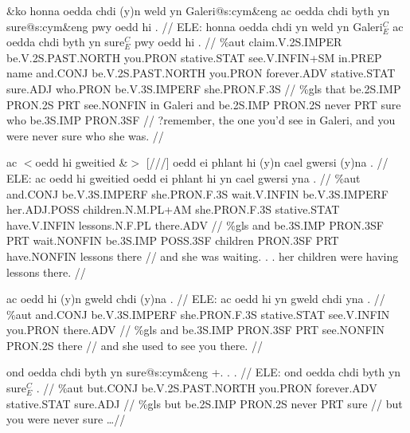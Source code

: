\documentclass[a4paper,10pt]{article}
\begin{document}
\ex
\begingl[lingstyle=gergl]
\glchat \&ko honna oedda chdi (y)n weld yn Galeri@s:cym\&eng ac oedda chdi byth yn sure@s:cym\&eng pwy oedd hi . //
\glsurface ELE:  honna oedda chdi yn weld yn Galeri$^{C}_{E}$ ac oedda chdi byth yn sure$^{C}_{E}$ pwy oedd hi .  //
\glauto \%aut  claim{\scriptsize .V.2S.IMPER} be{\scriptsize .V.2S.PAST.NORTH} you{\scriptsize .PRON} stative{\scriptsize .STAT} see{\scriptsize .V.INFIN+SM} in{\scriptsize .PREP} name and{\scriptsize .CONJ} be{\scriptsize .V.2S.PAST.NORTH} you{\scriptsize .PRON} forever{\scriptsize .ADV} stative{\scriptsize .STAT} sure{\scriptsize .ADJ} who{\scriptsize .PRON} be{\scriptsize .V.3S.IMPERF} she{\scriptsize .PRON.F.3S}   //
\glmanual \%gls  that be{\scriptsize .2S.IMP} PRON{\scriptsize .2S} PRT see{\scriptsize .NONFIN} in Galeri and be{\scriptsize .2S.IMP} PRON{\scriptsize .2S} never PRT sure who be{\scriptsize .3S.IMP} PRON{\scriptsize .3SF}   //
\gleng ?remember, the one you'd see in Galeri, and you were never sure who she was. //
\endgl
\xe

\ex
\begingl[lingstyle=gergl]
\glchat ac $<$oedd hi gweitied \&$>$ [///] oedd ei phlant hi (y)n cael gwersi (y)na . //
\glsurface ELE:  ac oedd hi gweitied oedd ei phlant hi yn cael gwersi yna .  //
\glauto \%aut  and{\scriptsize .CONJ} be{\scriptsize .V.3S.IMPERF} she{\scriptsize .PRON.F.3S} wait{\scriptsize .V.INFIN} be{\scriptsize .V.3S.IMPERF} her{\scriptsize .ADJ.POSS} children{\scriptsize .N.M.PL+AM} she{\scriptsize .PRON.F.3S} stative{\scriptsize .STAT} have{\scriptsize .V.INFIN} lessons{\scriptsize .N.F.PL} there{\scriptsize .ADV}   //
\glmanual \%gls  and be{\scriptsize .3S.IMP} PRON{\scriptsize .3SF} PRT wait{\scriptsize .NONFIN} be{\scriptsize .3S.IMP} POSS{\scriptsize .3SF} children PRON{\scriptsize .3SF} PRT have{\scriptsize .NONFIN} lessons there  //
\gleng and she was waiting. . . her children were having lessons there. //
\endgl
\xe

\ex
\begingl[lingstyle=gergl]
\glchat ac oedd hi (y)n gweld chdi (y)na . //
\glsurface ELE:  ac oedd hi yn gweld chdi yna .  //
\glauto \%aut  and{\scriptsize .CONJ} be{\scriptsize .V.3S.IMPERF} she{\scriptsize .PRON.F.3S} stative{\scriptsize .STAT} see{\scriptsize .V.INFIN} you{\scriptsize .PRON} there{\scriptsize .ADV}   //
\glmanual \%gls  and be{\scriptsize .3S.IMP} PRON{\scriptsize .3SF} PRT see{\scriptsize .NONFIN} PRON{\scriptsize .2S} there   //
\gleng and she used to see you there. //
\endgl
\xe

\ex
\begingl[lingstyle=gergl]
\glchat ond oedda chdi byth yn sure@s:cym\&eng +. . . //
\glsurface ELE:  ond oedda chdi byth yn sure$^{C}_{E}$ .  //
\glauto \%aut  but{\scriptsize .CONJ} be{\scriptsize .V.2S.PAST.NORTH} you{\scriptsize .PRON} forever{\scriptsize .ADV} stative{\scriptsize .STAT} sure{\scriptsize .ADJ}   //
\glmanual \%gls  but be{\scriptsize .2S.IMP} PRON{\scriptsize .2S} never PRT sure   //
\gleng but you were never sure \dots  //
\endgl
\xe
\end{document}
